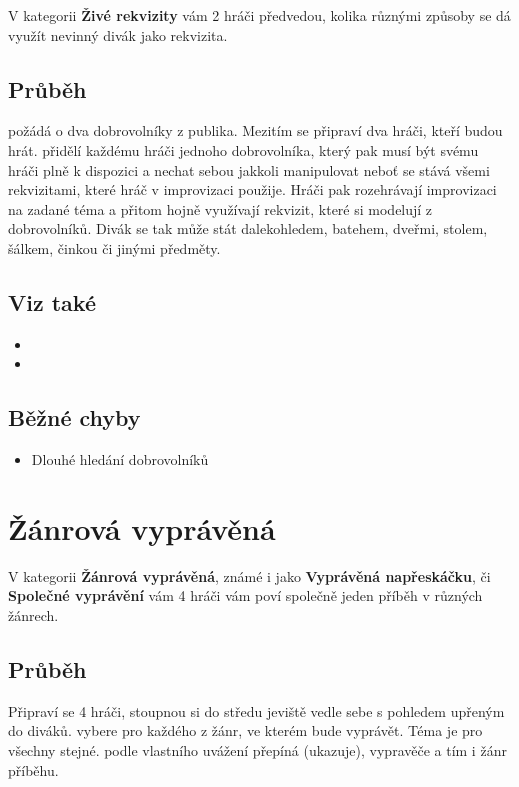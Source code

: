 \documentclass[main.tex]{subfiles}
\begin{document}
V kategorii \textbf{Živé rekvizity}{} vám 2 hráči předvedou, kolika různými způsoby se dá využít nevinný divák jako rekvizita. 
 
\subsection{ Průběh }  požádá o dva dobrovolníky z publika. Mezitím se připraví dva hráči, kteří budou hrát.  přidělí každému hráči jednoho dobrovolníka, který pak musí být svému hráči plně k dispozici a nechat  sebou jakkoli manipulovat neboť se stává všemi rekvizitami, které hráč v improvizaci použije. Hráči pak rozehrávají improvizaci na zadané téma a přitom hojně využívají rekvizit, které si modelují z dobrovolníků. Divák se tak může stát dalekohledem, batehem, dveřmi, stolem, šálkem, činkou či jinými předměty. 
 
\subsection{Viz také } \begin{itemize}
\item {}
\item {}
\end{itemize}
 
 
\subsection{ Běžné chyby } \begin{itemize}
\item Dlouhé hledání dobrovolníků
\end{itemize}
 
 
 
 
 
 
\needspace{5cm} \section{Žánrová vyprávěná} \label{žánrová vyprávěná}  
 
V kategorii \textbf{Žánrová vyprávěná}{}, známé i jako \textbf{Vyprávěná napřeskáčku}{}, či \textbf{Společné vyprávění}{}  vám 4 hráči vám poví společně jeden příběh v různých žánrech. 
 
\subsection{ Průběh } Připraví se 4 hráči, stoupnou si do středu jeviště vedle sebe s pohledem upřeným do diváků.  vybere pro každého z  žánr, ve kterém bude vyprávět. Téma je pro všechny stejné.  podle vlastního uvážení přepíná (ukazuje), vypravěče a tím i žánr příběhu. 
 
\end{document}
